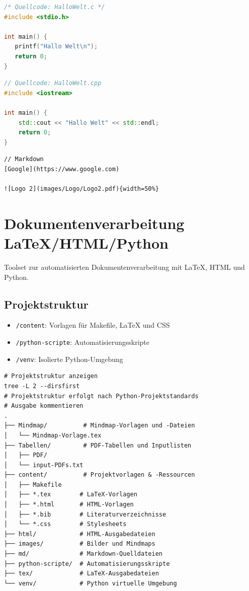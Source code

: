 \documentclass{content/vorlage-design-main}
\begin{document}
\begin{lstlisting}[language=C]
/* Quellcode: HalloWelt.c */
#include <stdio.h>

int main() {
   printf("Hallo Welt\n");
   return 0;
}
\end{lstlisting}

\begin{lstlisting}[language={C++}]
// Quellcode: HalloWelt.cpp
#include <iostream>

int main() {
    std::cout << "Hallo Welt" << std::endl;
    return 0;
}
\end{lstlisting}

\begin{lstlisting}
// Markdown
[Google](https://www.google.com)

![Logo 2](images/Logo/Logo2.pdf){width=50%}
\end{lstlisting}

\section{Dokumentenverarbeitung
LaTeX/HTML/Python}\label{dokumentenverarbeitung-latexhtmlpython}

Toolset zur automatisierten Dokumentenverarbeitung mit LaTeX, HTML und
Python.

\subsection{Projektstruktur}\label{projektstruktur}

\begin{itemize}

\item
  \verb|/content|: Vorlagen für Makefile, LaTeX und
  CSS
\item
  \verb|/python-scripte|: Automatisierungsskripte
\item
  \verb|/venv|: Isolierte Python-Umgebung
\end{itemize}

\begin{lstlisting}
# Projektstruktur anzeigen
tree -L 2 --dirsfirst
# Projektstruktur erfolgt nach Python-Projektstandards
# Ausgabe kommentieren
.
├── Mindmap/          # Mindmap-Vorlagen und -Dateien
│   └── Mindmap-Vorlage.tex
├── Tabellen/         # PDF-Tabellen und Inputlisten
│   ├── PDF/
│   └── input-PDFs.txt
├── content/          # Projektvorlagen & -Ressourcen
│   ├── Makefile
│   ├── *.tex        # LaTeX-Vorlagen
│   ├── *.html       # HTML-Vorlagen
│   ├── *.bib        # Literaturverzeichnisse
│   └── *.css        # Stylesheets
├── html/            # HTML-Ausgabedateien
├── images/          # Bilder und Mindmaps
├── md/              # Markdown-Quelldateien
├── python-scripte/  # Automatisierungsskripte
├── tex/             # LaTeX-Ausgabedateien
└── venv/            # Python virtuelle Umgebung
\end{lstlisting}
\end{document}
